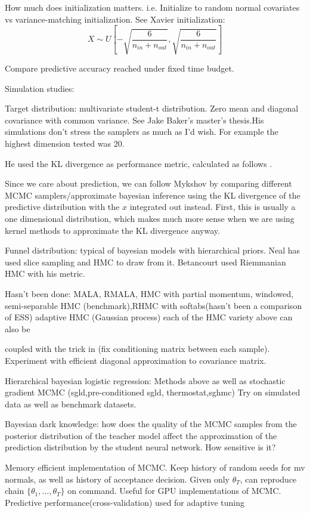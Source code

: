 \documentclass{book}
\begin{document}
\begin{enumerate}
How much does initialization matters. i.e. Initialize to random normal covariates vs variance-matching initialization. See Xavier initialization: 
\[X \sim U[- \sqrt{\frac{6}{n_{in}+n_{out}}}, \sqrt{\frac{6}{n_{in}+n_{out}}}] \]

Compare predictive accuracy reached under fixed time budget.

Simulation studies: 

Target distribution: multivariate student-t distribution. Zero mean and diagonal covariance with common variance. See Jake Baker's master's thesis.His simulations don't stress the samplers as much as I'd wish. For example the highest dimension tested was 20. 

He used the KL divergence as performance metric, calculated as follows \cite{boltz2007high}. 

Since we care about prediction, we can follow Mykshov by comparing different MCMC samplers/approximate bayesian inference using the KL divergence of the predictive distribution with the $x$ integrated out instead. First, this is usually a one dimensional distribution, which makes much more sense when we are using kernel methods to approximate the KL divergence anyway.

Funnel distribution: typical of bayesian models with hierarchical priors. Neal has used slice sampling and HMC to draw from it. Betancourt used Riemmanian HMC with his metric. 

Hasn't been done: MALA, RMALA, HMC with partial momentum, windowed,
semi-separable HMC (benchmark),RHMC with softabs(hasn't been a comparison of
ESS) adaptive HMC (Gaussian process) each of the HMC variety above can also be

coupled with the trick in \cite{burda2011bayesian} (fix conditioning matrix
between each sample).
Experiment with efficient diagonal approximation to covariance matrix.

Hierarchical bayesian logistic regression: Methods above as well as stochastic
gradient MCMC (sgld,pre-conditioned sgld, thermostat,sghmc)
Try on simulated data as well as benchmark datasets.


Bayesian dark knowledge: how does the quality of the MCMC samples from the
posterior distribution of the teacher model affect the approximation of the
prediction distribution by the student neural network. How sensitive is it?


Memory efficient implementation of MCMC.
Keep history of random seeds for mv normals, as well as history of acceptance
decision.
Given only $\theta_T$, can reproduce chain $\{\theta_1, \dots, \theta_T \}$ on
command.
Useful for GPU implementations of MCMC.
Predictive performance(cross-validation) used for adaptive
tuning\cite{wang2013adaptive}



\end{enumerate}
\end{document}
